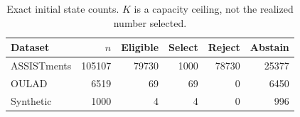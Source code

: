 \begin{table}[t]
\centering
\small
\caption{Exact initial state counts. $K$ is a capacity ceiling, not the realized number selected.}
\label{tab:state-counts}
\begin{tabular}{lrrrrr}
\toprule
Dataset & $n$ & Eligible & Select & Reject & Abstain \\
\midrule
ASSISTments & 105107 & 79730 & 1000 & 78730 & 25377 \\
OULAD & 6519 & 69 & 69 & 0 & 6450 \\
Synthetic & 1000 & 4 & 4 & 0 & 996 \\
\bottomrule
\end{tabular}
\end{table}
